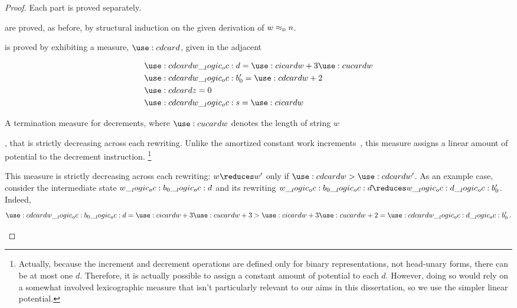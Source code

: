 \begin{proof}
  Each part is proved separately.
  \begin{description}[
    parsep=0pt, listparindent=\parindent,
    labelsep=0.35em
  ]
  \item[Preservation and progress]
    are proved, as before, by structural induction on the given derivation of $w \approx\sb{\text{\normalfont\scshape d}} n$.
  \item[Termination] is proved by exhibiting a measure, $\card[d]{}$, given in the adjacent %
    \begin{marginfigure}
      \begin{equation*}
        \begin{lgathered}
          \card[d]{w \oc d} = \card[i]{w} + 3 \card{w} \\
          \card[d]{w \oc b'_0} = \card[d]{w} + 2 \\
          \card[d]{z} = 0 \\
          \card[d]{w \oc s} = \card[i]{w}
        \end{lgathered}
      \end{equation*}
      \caption{A termination measure for decrements, where $\card{w}$ denotes the length of string $w$}\label{fig:string-rewriting:dec-measure}
    \end{marginfigure}%
, that is strictly decreasing across each rewriting.
    Unlike the amortized constant work increments~, this measure assigns a linear amount of potential to the decrement instruction.%
    \footnote[][0.5\baselineskip]{Actually, because the increment and decrement operations are defined only for binary representations, not head-unary forms, there can be at most one $d$.
      Therefore, it is actually possible to assign a constant amount of potential to each $d$.
      However, doing so would rely on a somewhat involved lexicographic measure that isn't particularly relevant to our aims in this dissertation, so we use the simpler linear potential.}%

    This measure is strictly decreasing across each rewriting: $w \reduces w'$ only if $\card[d]{w} > \card[d]{w'}$.
    As an example case, consider the intermediate state $w \__logic_oc: b_0 \__logic_oc: d$ and its rewriting $w \oc b_0 \oc d \reduces w \oc d \oc b'_0$.
    Indeed,
    \begin{equation*}
      \card[d]{w \oc b_0 \oc d}
        = \card[i]{w} + 3\card{w} + 3
        > \card[i]{w} + 3\card{w} + 2
        = \card[d]{w \oc d \oc b'_0}
      \,.
    \qedhere
    \end{equation*}
  \end{description}
\end{proof}

